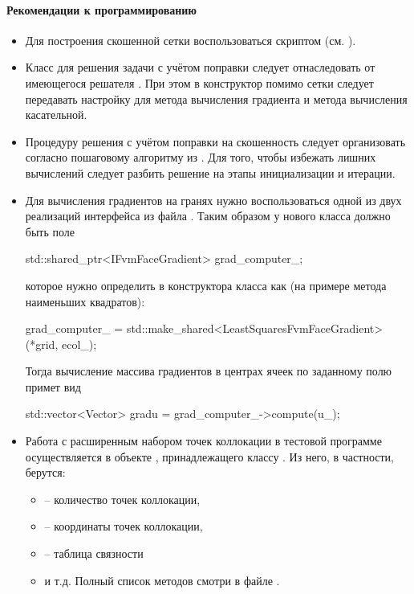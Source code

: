 \paragraph{Рекомендации к программированию}
\begin{itemize}
\item
Для построения скошенной сетки воспользоваться скриптом 
(см. ).
\item
Класс для решения задачи с учётом поправки  следует отнаследовать
от имеющегося решателя . При этом в конструктор
помимо сетки следует передавать настройку для метода вычисления градиента
и метода вычисления касательной.
\item
Процедуру решения с учётом поправки на скошенность следует
организовать согласно пошаговому алгоритму из .
Для того, чтобы избежать лишних вычислений следует разбить решение на этапы
инициализации и итерации.
\item
Для вычисления градиентов на гранях нужно воспользоваться
одной из двух реализаций интерфейса 
из файла .
Таким образом у нового класса должно быть поле
\begin{cppcode}
std::shared_ptr<IFvmFaceGradient> grad_computer_;
\end{cppcode}
которое нужно определить в конструктора класса как (на примере метода наименьших квадратов):
\begin{cppcode}
grad_computer_ = std::make_shared<LeastSquaresFvmFaceGradient>(*grid, ecol_);
\end{cppcode}
Тогда вычисление массива градиентов в центрах ячеек по заданному полю  примет вид
\begin{cppcode}
std::vector<Vector> gradu = grad_computer_->compute(u_);
\end{cppcode}
\item
Работа с расширенным набором точек коллокации в тестовой программе
осуществляется в объекте , принадлежащего классу .
Из него, в частности, берутся:
\begin{itemize}
\item {} -- количество точек коллокации,
\item {} -- координаты точек коллокации,
\item {} -- таблица связности 
\item и т.д. Полный список методов смотри в файле .

\end{itemize}
\end{itemize}
